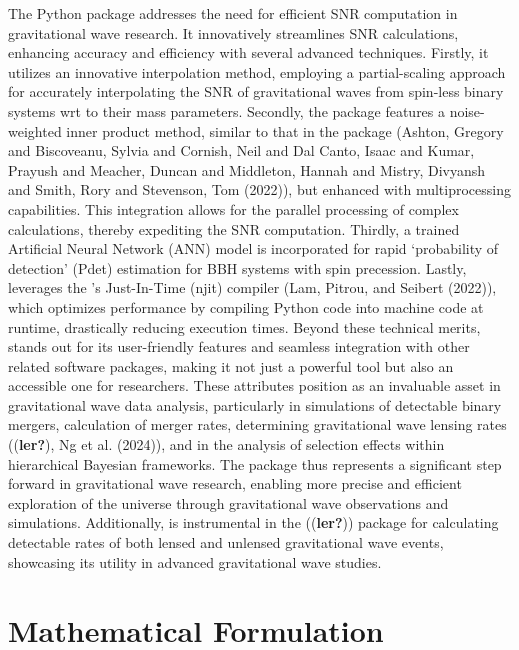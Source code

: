 \documentclass[10pt,a4paper,onecolumn]{article}
\let\textttOrig=\texttt
\def\texttt#1{\expandafter\textttOrig{\seqsplit{#1}}}
\begin{document}
The \emph{\texttt{gwsnr}} Python package addresses the need for
efficient SNR computation in gravitational wave research. It
innovatively streamlines SNR calculations, enhancing accuracy and
efficiency with several advanced techniques. Firstly, it utilizes an
innovative interpolation method, employing a partial-scaling approach
for accurately interpolating the SNR of gravitational waves from
spin-less binary systems wrt to their mass parameters. Secondly, the
package features a noise-weighted inner product method, similar to that
in the \emph{\texttt{bilby}} package (Ashton, Gregory and Biscoveanu,
Sylvia and Cornish, Neil and Dal Canto, Isaac and Kumar, Prayush and
Meacher, Duncan and Middleton, Hannah and Mistry, Divyansh and Smith,
Rory and Stevenson, Tom (2022)), but enhanced with multiprocessing
capabilities. This integration allows for the parallel processing of
complex calculations, thereby expediting the SNR computation. Thirdly, a
trained Artificial Neural Network (ANN) model is incorporated for rapid
`probability of detection' (Pdet) estimation for BBH systems with spin
precession. Lastly, \emph{\texttt{gwsnr}} leverages the
\emph{\texttt{numba}}'s Just-In-Time (njit) compiler (Lam, Pitrou, and
Seibert (2022)), which optimizes performance by compiling Python code
into machine code at runtime, drastically reducing execution times.
Beyond these technical merits, \emph{\texttt{gwsnr}} stands out for its
user-friendly features and seamless integration with other related
software packages, making it not just a powerful tool but also an
accessible one for researchers. These attributes position
\emph{\texttt{gwsnr}} as an invaluable asset in gravitational wave data
analysis, particularly in simulations of detectable binary mergers,
calculation of merger rates, determining gravitational wave lensing
rates ((\textbf{ler?}), Ng et al. (2024)), and in the analysis of
selection effects within hierarchical Bayesian frameworks. The package
thus represents a significant step forward in gravitational wave
research, enabling more precise and efficient exploration of the
universe through gravitational wave observations and simulations.
Additionally, \emph{\texttt{gwsnr}} is instrumental in the
\emph{\texttt{ler}} ((\textbf{ler?})) package for calculating detectable
rates of both lensed and unlensed gravitational wave events, showcasing
its utility in advanced gravitational wave studies.

\section{Mathematical Formulation}\label{mathematical-formulation}
\end{document}
